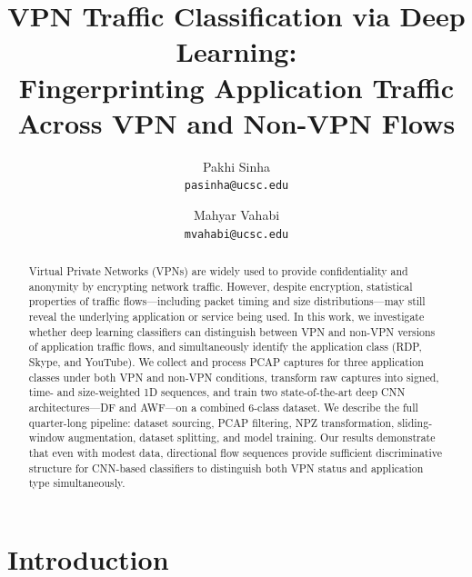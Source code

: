 \documentclass[letterpaper,twocolumn,10pt]{article}
\begin{document}

\title{VPN Traffic Classification via Deep Learning:\\
Fingerprinting Application Traffic Across VPN and Non-VPN Flows}

\author{
{\rm Pakhi Sinha}\\
\texttt{pasinha@ucsc.edu}
\and
{\rm Mahyar Vahabi}\\
\texttt{mvahabi@ucsc.edu}
}

\maketitle

\begin{abstract}
Virtual Private Networks (VPNs) are widely used to provide confidentiality and anonymity by encrypting network traffic. However, despite encryption, statistical properties of traffic flows---including packet timing and size distributions---may still reveal the underlying application or service being used. In this work, we investigate whether deep learning classifiers can distinguish between VPN and non-VPN versions of application traffic flows, and simultaneously identify the application class (RDP, Skype, and YouTube). We collect and process PCAP captures for three application classes under both VPN and non-VPN conditions, transform raw captures into signed, time- and size-weighted 1D sequences, and train two state-of-the-art deep CNN architectures---DF and AWF---on a combined 6-class dataset. We describe the full quarter-long pipeline: dataset sourcing, PCAP filtering, NPZ transformation, sliding-window augmentation, dataset splitting, and model training. Our results demonstrate that even with modest data, directional flow sequences provide sufficient discriminative structure for CNN-based classifiers to distinguish both VPN status and application type simultaneously.
\end{abstract}

\section{Introduction}
\end{document}
